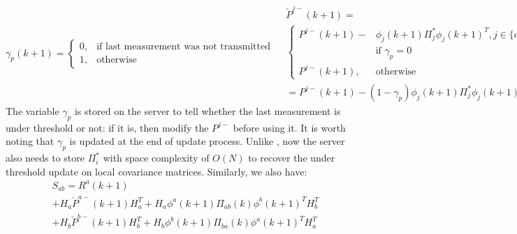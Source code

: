 \documentclass[conference]{IEEEtran}
\begin{document}
\begin{subequations}
\begin{equation}
	\gamma_{p}(k+1) = \begin{cases}
	0, & \text{if last measurement was not transmitted} \\
	1, & \text{otherwise}
	\end{cases}
\end{equation}
\begin{equation}
\begin{split}
&\check{P}^{j-}(k+1) =
\\&\begin{cases}
	P^{j-}(k+1) - &\phi_j(k+1)\Pi_j^*\phi_j(k+1)^T ,j\in\{a,b\},
 \\& \text{if } \gamma_{p} = 0 \\
 P^{j-}(k+1), & \text{otherwise}
\end{cases}
\\&= P^{j-}(k+1) - (1-\gamma_{p})\phi_j(k+1)\Pi_j^*\phi_j(k+1)^T
\end{split}
\label{equ::TEKF_P_rec}
\end{equation}
\end{subequations}
The variable $\gamma_p$ is stored on the server to tell whether the last measurement is under threshold or not: if it is, then modify the $P^{j-}$ before using it.
It is worth noting that $\gamma_{p}$ is updated at the end of update process.
Unlike \cite{kia2018serverassisted}, now the server also needs to store $\Pi_i^*$ with space complexity of $O(N)$ to recover the under threshold update on local covariance matrices.
Similarly, we also have:
\begin{equation}
	\begin{split}
	&S_{ab} = R^a(k+1) \\&+ H_a\check{P}^{a-}(k+1)H_a^T + H_a\phi^a(k+1)\Pi_{ab}(k)\phi^b(k+1)^TH_b^T
	\\ &+ H_b\check{P}^{b-}(k+1)H_b^T + H_b\phi^b(k+1)\Pi_{ba}(k)\phi^a(k+1)^TH_a^T
	\end{split}
	\label{equ::TEKF_sab}
\end{equation}
\end{document}
